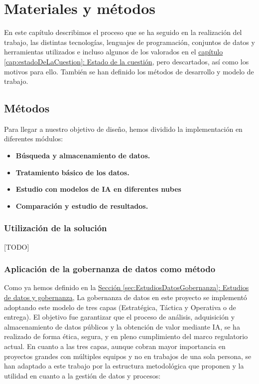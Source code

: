 \chapter{Materiales y métodos}
\label{cap:Materiales y metodos}



En este capítulo describimos el proceso que se ha seguido en la realización del trabajo, las distintas tecnologías, lenguajes de programación, conjuntos de datos y herramientas utilizados e incluso algunos de los valorados en el \hyperref[cap:estadoDeLaCuestion]{capítulo \ref*{cap:estadoDeLaCuestion}: Estado de la cuestión}, pero descartados, así como los motivos para ello. También se han definido los métodos de desarrollo y modelo de trabajo. \\


\section{Métodos}

Para llegar a nuestro objetivo de diseño, hemos dividido la implementación en diferentes módulos:

\begin{itemize}
	\item \textbf{ Búsqueda y almacenamiento de datos.}
	\item \textbf{ Tratamiento básico de los datos.}
	\item \textbf{ Estudio con modelos de IA en diferentes nubes}
	\item \textbf{ Comparación y estudio de resultados.}
\end{itemize}

\subsection{Utilización de la solución}

[TODO]

\subsection{Aplicación de la gobernanza de datos como método}  \label{sec:Metodos_Gobernanza}

Como ya hemos definido en la \hyperref[sec:EstudiosDatosGobernanza]{Sección \ref*{sec:EstudiosDatosGobernanza}: Estudios de datos y gobernanza}, La gobernanza de datos en este proyecto se implementó adoptando este modelo de tres capas (Estratégica, Táctica y Operativa o de entrega). El objetivo fue garantizar que el proceso de análisis, adquisición y almacenamiento de datos públicos y la obtención de valor mediante IA, se ha realizado de forma ética, segura, y en pleno cumplimiento del marco regulatorio actual. En cuanto a las tres capas, aunque cobran mayor importancia en proyectos grandes con múltiples equipos y no en trabajos de una sola persona, se han adaptado a este trabajo por la estructura metodológica que proponen y la utilidad en cuanto a la gestión de datos y procesos:

